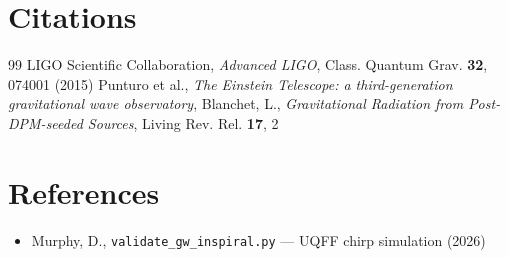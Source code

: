 \documentclass[12pt,a4paper]{article}
\begin{document}
\section*{Citations}
\begin{thebibliography}{99}
 LIGO Scientific Collaboration, \emph{Advanced LIGO}, Class. Quantum Grav. \textbf{32}, 074001 (2015)
 Punturo et al., \emph{The Einstein Telescope: a third-generation gravitational wave observatory},
 Blanchet, L., \emph{Gravitational Radiation from Post-DPM-seeded Sources}, Living Rev. Rel. \textbf{17}, 2
\end{thebibliography}

\section*{References}
\begin{itemize}
  \item[4.] Murphy, D., \texttt{validate\_{gw\_inspiral}.py} --- UQFF chirp simulation (2026)
\end{itemize}

\end{document}
